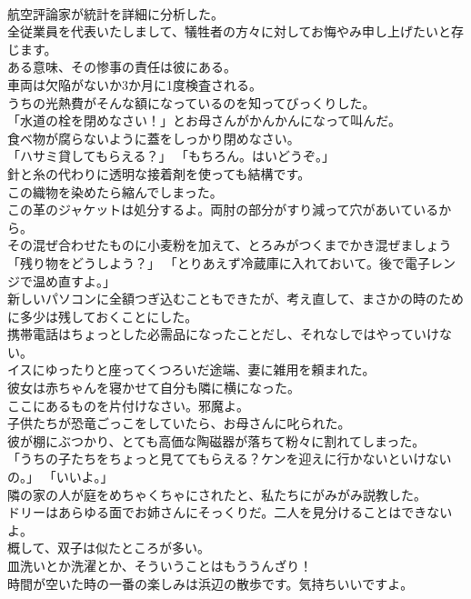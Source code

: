 \documentclass[8pt]{extreport}
\begin{document}
\begin{CJK}{UTF8}{min}
\\	航空評論家が統計を詳細に分析した。	
\\	全従業員を代表いたしまして、犠牲者の方々に対してお悔やみ申し上げたいと存じます。	
\\	ある意味、その惨事の責任は彼にある。	
\\	車両は欠陥がないか3か月に1度検査される。	
\\	うちの光熱費がそんな額になっているのを知ってびっくりした。	
\\	「水道の栓を閉めなさい！」とお母さんがかんかんになって叫んだ。	
\\	食べ物が腐らないように蓋をしっかり閉めなさい。	
\\	「ハサミ貸してもらえる？」 「もちろん。はいどうぞ。」	
\\	針と糸の代わりに透明な接着剤を使っても結構です。	
\\	この織物を染めたら縮んでしまった。	
\\	この革のジャケットは処分するよ。両肘の部分がすり減って穴があいているから。	
\\	その混ぜ合わせたものに小麦粉を加えて、とろみがつくまでかき混ぜましょう	
\\	「残り物をどうしよう？」 「とりあえず冷蔵庫に入れておいて。後で電子レンジで温め直すよ。」	
\\	新しいパソコンに全額つぎ込むこともできたが、考え直して、まさかの時のために多少は残しておくことにした。	
\\	携帯電話はちょっとした必需品になったことだし、それなしではやっていけない。	
\\	イスにゆったりと座ってくつろいだ途端、妻に雑用を頼まれた。	
\\	彼女は赤ちゃんを寝かせて自分も隣に横になった。	
\\	ここにあるものを片付けなさい。邪魔よ。	
\\	子供たちが恐竜ごっこをしていたら、お母さんに叱られた。	
\\	彼が棚にぶつかり、とても高価な陶磁器が落ちて粉々に割れてしまった。	
\\	「うちの子たちをちょっと見ててもらえる？ケンを迎えに行かないといけないの。」 「いいよ。」	
\\	隣の家の人が庭をめちゃくちゃにされたと、私たちにがみがみ説教した。	
\\	ドリーはあらゆる面でお姉さんにそっくりだ。二人を見分けることはできないよ。	
\\	概して、双子は似たところが多い。	
\\	皿洗いとか洗濯とか、そういうことはもううんざり！	
\\	時間が空いた時の一番の楽しみは浜辺の散歩です。気持ちいいですよ。	

\end{CJK}
\end{document}
